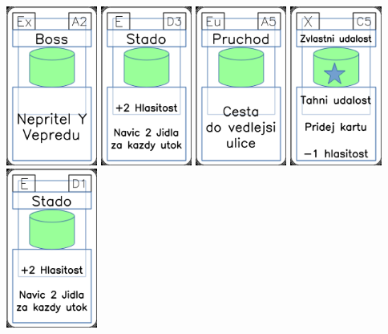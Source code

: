 \documentclass[a4paper]{article}
\begin{document}
	\includegraphics[width=3.0cm]{img-4_1}
	\includegraphics[width=3.0cm]{img-4_47}
	\includegraphics[width=3.0cm]{img-4_34}
	\includegraphics[width=3.0cm]{img-5_14}
	\includegraphics[width=3.0cm]{img-4_45}
\end{document}
